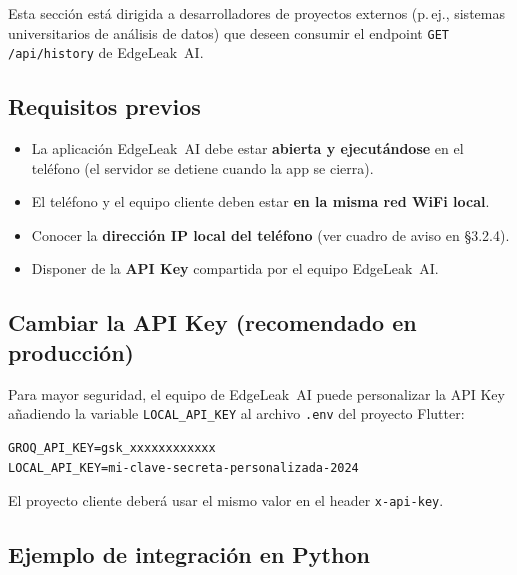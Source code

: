 \documentclass[12pt,a4paper]{article}
\begin{document}
Esta sección está dirigida a desarrolladores de proyectos externos (p.\,ej., sistemas
universitarios de análisis de datos) que deseen consumir el endpoint
\texttt{GET /api/history} de EdgeLeak~AI.

\subsection{Requisitos previos}

\begin{itemize}[leftmargin=2em]
  \item La aplicación EdgeLeak~AI debe estar \textbf{abierta y ejecutándose} en el
        teléfono (el servidor se detiene cuando la app se cierra).
  \item El teléfono y el equipo cliente deben estar \textbf{en la misma red WiFi local}.
  \item Conocer la \textbf{dirección IP local del teléfono} (ver cuadro de aviso en §3.2.4).
  \item Disponer de la \textbf{API Key} compartida por el equipo EdgeLeak~AI.
\end{itemize}

\subsection{Cambiar la API Key (recomendado en producción)}

Para mayor seguridad, el equipo de EdgeLeak~AI puede personalizar la API Key añadiendo
la variable \texttt{LOCAL\_API\_KEY} al archivo \texttt{.env} del proyecto Flutter:

\begin{lstlisting}[caption={Configurar API Key personalizada en .env}]
GROQ_API_KEY=gsk_xxxxxxxxxxxx
LOCAL_API_KEY=mi-clave-secreta-personalizada-2024
\end{lstlisting}

El proyecto cliente deberá usar el mismo valor en el header \texttt{x-api-key}.

\subsection{Ejemplo de integración en Python}
\end{document}

